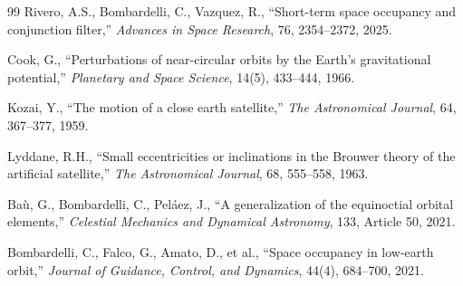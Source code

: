 \documentclass[11pt]{article}
\begin{document}
\begin{thebibliography}{99}
Rivero, A.S., Bombardelli, C., Vazquez, R.,
``Short-term space occupancy and conjunction filter,''
\emph{Advances in Space Research}, 76, 2354--2372, 2025.

Cook, G.,
``Perturbations of near-circular orbits by the Earth's gravitational
potential,''
\emph{Planetary and Space Science}, 14(5), 433--444, 1966.

Kozai, Y.,
``The motion of a close earth satellite,''
\emph{The Astronomical Journal}, 64, 367--377, 1959.

Lyddane, R.H.,
``Small eccentricities or inclinations in the Brouwer theory of the
artificial satellite,''
\emph{The Astronomical Journal}, 68, 555--558, 1963.

Ba\`u, G., Bombardelli, C., Peláez, J.,
``A generalization of the equinoctial orbital elements,''
\emph{Celestial Mechanics and Dynamical Astronomy}, 133, Article 50, 2021.

Bombardelli, C., Falco, G., Amato, D., et al.,
``Space occupancy in low-earth orbit,''
\emph{Journal of Guidance, Control, and Dynamics}, 44(4), 684--700, 2021.
\end{thebibliography}
\end{document}
